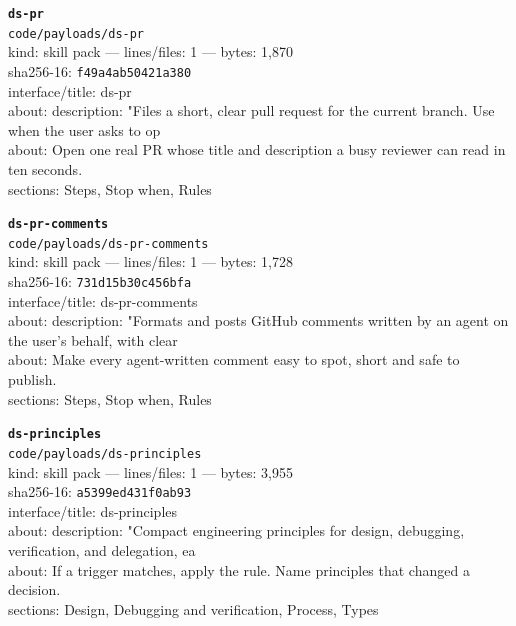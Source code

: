 \noindent\textbf{\texttt{ds-pr}}\\
\texttt{code/payloads/ds-pr}\\
kind: skill pack --- lines/files: 1 --- bytes: 1,870\\
sha256-16: \texttt{f49a4ab50421a380}\\
interface/title: ds-pr\\
about: description: "Files a short, clear pull request for the current branch. Use when the user asks to op\\
about: Open one real PR whose title and description a busy reviewer can read in ten seconds.\\
sections: Steps, Stop when, Rules\\
\vspace*{6.0pt}

\noindent\textbf{\texttt{ds-pr-comments}}\\
\texttt{code/payloads/ds-pr-comments}\\
kind: skill pack --- lines/files: 1 --- bytes: 1,728\\
sha256-16: \texttt{731d15b30c456bfa}\\
interface/title: ds-pr-comments\\
about: description: "Formats and posts GitHub comments written by an agent on the user's behalf, with clear\\
about: Make every agent-written comment easy to spot, short and safe to publish.\\
sections: Steps, Stop when, Rules\\
\vspace*{6.0pt}

\noindent\textbf{\texttt{ds-principles}}\\
\texttt{code/payloads/ds-principles}\\
kind: skill pack --- lines/files: 1 --- bytes: 3,955\\
sha256-16: \texttt{a5399ed431f0ab93}\\
interface/title: ds-principles\\
about: description: "Compact engineering principles for design, debugging, verification, and delegation, ea\\
about: If a trigger matches, apply the rule. Name principles that changed a decision.\\
sections: Design, Debugging and verification, Process, Types\\
\vspace*{6.0pt}
\newpage

